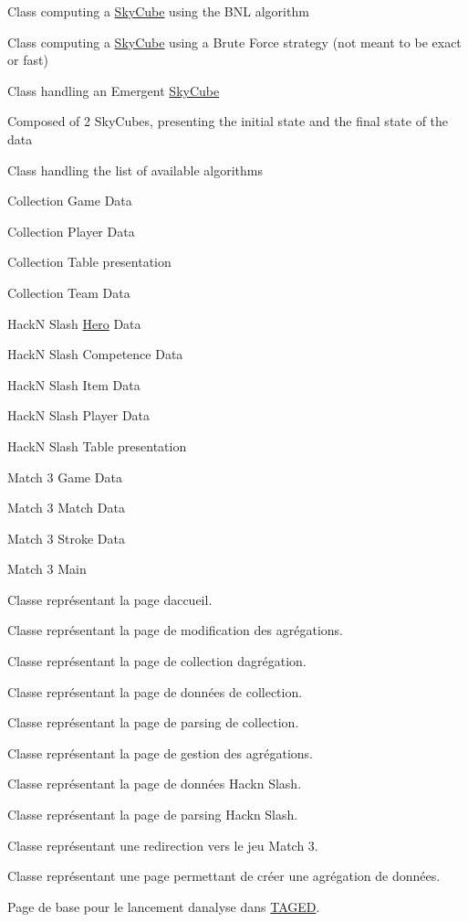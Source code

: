 Class computing a \hyperlink{class_sky_cube}{Sky\+Cube} using the B\+NL algorithm 

Class computing a \hyperlink{class_sky_cube}{Sky\+Cube} using a Brute Force strategy (not meant to be exact or fast) 

Class handling an Emergent \hyperlink{class_sky_cube}{Sky\+Cube}

Composed of 2 Sky\+Cubes, presenting the initial state and the final state of the data 

Class handling the list of available algorithms

Collection Game Data 

Collection Player Data 

Collection Table presentation 

Collection Team Data 

Hack\textquotesingle{}N Slash \hyperlink{class_hero}{Hero} Data 

Hack\textquotesingle{}N Slash Competence Data 

Hack\textquotesingle{}N Slash Item Data 

Hack\textquotesingle{}N Slash Player Data 

Hack\textquotesingle{}N Slash Table presentation 

Match 3 Game Data 

Match 3 Match Data 

Match 3 Stroke Data 

Match 3 Main 

Classe représentant la page d\textquotesingle{}accueil.

Classe représentant la page de modification des agrégations.

Classe représentant la page de collection d\textquotesingle{}agrégation.

Classe représentant la page de données de collection.

Classe représentant la page de parsing de collection.

Classe représentant la page de gestion des agrégations.

Classe représentant la page de données Hack\textquotesingle{}n Slash.

Classe représentant la page de parsing Hack\textquotesingle{}n Slash.

Classe représentant une redirection vers le jeu Match 3.

Classe représentant une page permettant de créer une agrégation de données.

Page de base pour le lancement d\textquotesingle{}analyse dans \hyperlink{namespace_t_a_g_e_d}{T\+A\+G\+ED}.

